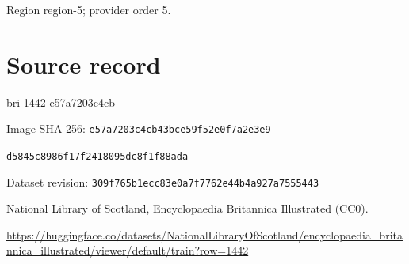 \documentclass[11pt]{article}
\begin{document}
\par

{\scriptsize\color{gray} Region region-5; provider order 5.\par}
\medskip
\newpage\section*{Source record}
bri-1442-e57a7203c4cb\par
Image SHA-256: \texttt{e57a7203c4cb43bce59f52e0f7a2e3e9}\par\texttt{d5845c8986f17f2418095dc8f1f88ada}\par
Dataset revision: \texttt{309f765b1ecc83e0a7f7}\texttt{762e44b4a927a7555443}\par
National Library of Scotland, Encyclopaedia Britannica Illustrated (CC0).\par
\url{https://huggingface.co/datasets/NationalLibraryOfScotland/encyclopaedia_britannica_illustrated/viewer/default/train?row=1442}
\end{document}
